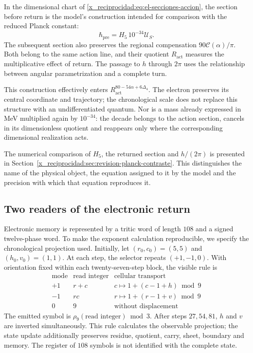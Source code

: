 In the dimensional chart of \eqref{x_reciprocidad:eq:el-secciones-accion}, the section before return is the model's construction intended for comparison with the reduced Planck constant:
\[
 \hbar_{\mathrm{pre}}=H_5\,10^{-34}\mathcal U_S.
\]
The subsequent section also preserves the regional compensation \(90\mathscr C(\alpha)/\pi\). Both belong to the same action line, and their quotient \(R_{\mathrm{act}}\) measures the multiplicative effect of return. The passage to \(h\) through \(2\pi\) uses the relationship between angular parametrization and a complete turn.

This construction effectively enters \(R_{\mathrm{act}}^{80-54\alpha+6\Delta_4}\). The electron preserves its central coordinate and trajectory; the chronological scale does not replace this structure with an undifferentiated quantum. Nor is a mass already expressed in MeV multiplied again by \(10^{-34}\): the decade belongs to the action section, cancels in its dimensionless quotient and reappears only where the corresponding dimensional realization acts.

The numerical comparison of \(H_5\), the returned section and \(h/(2\pi)\) is presented in Section~\ref{x_reciprocidad:sec:revision-planck-contraste}. This distinguishes the name of the physical object, the equation assigned to it by the model and the precision with which that equation reproduces it.



\subsection{Two readers of the electronic return}

Electronic memory is represented by a tritic word of length
\(108\) and a signed twelve-phase word. To make the exponent
calculation reproducible, we specify the chronological projection
used. Initially, let
\((r_0,c_0)=(5,5)\) and \((h_0,v_0)=(1,1)\). At each step, the selector
repeats \((+1,-1,0)\). With orientation fixed within each
twenty-seven-step block, the visible rule is
\[
 \begin{array}{c|c|c}
 \text{mode}&\text{read integer}&\text{cellular transport}\\\hline
 +1&r+c&c\mapsto1+(c-1+h)\bmod9\\
 -1&rc&r\mapsto1+(r-1+v)\bmod9\\
 0&9&\text{without displacement}
 \end{array}
\]
The emitted symbol is \(\rho_9(\text{read integer})\bmod3\).
After steps \(27,54,81\), \(h\) and \(v\)
are inverted simultaneously. This rule calculates the observable projection; the
state update additionally preserves residue, quotient,
carry, sheet, boundary and memory. The register of
\(108\) symbols is not identified with the complete state.

